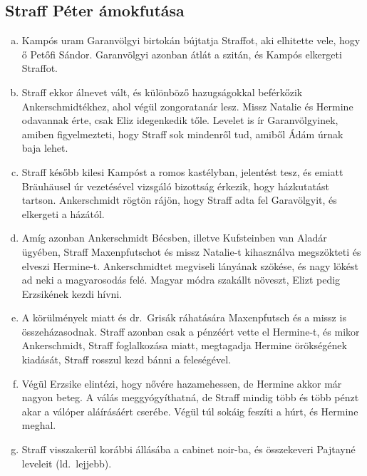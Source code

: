 \documentclass{thesis-ekf}
\theoremstyle{definition}
\begin{document}
    \subsection{Straff Péter ámokfutása}

    \begin{enumerate}[a)]
        \item\label{itm:Petofi} Kampós uram Garanvölgyi birtokán bújtatja Straffot, aki elhitette vele, hogy ő Petőfi Sándor.
        Garanvölgyi azonban átlát a szitán, és Kampós elkergeti Straffot.
        \item\label{itm:Bogumil} Straff ekkor álnevet vált, és különböző hazugságokkal beférkőzik Ankerschmidtékhez, ahol végül zongoratanár lesz.
        Missz Natalie és Hermine odavannak érte, csak Eliz idegenkedik tőle.
        Levelet is ír Garanvölgyinek, amiben figyelmezteti, hogy Straff sok mindenről tud, amiből Ádám úrnak baja lehet.
        \item\label{itm:hazkutatas} Straff később kilesi Kampóst a romos kastélyban, jelentést tesz, és emiatt Bräuhäusel úr vezetésével
            vizsgáló bizottság érkezik, hogy házkutatást tartson.
        Ankerschmidt rögtön rájön, hogy Straff adta fel Garavölgyit, és elkergeti a házától.
        \item\label{itm:Hermine-szokese} Amíg azonban Ankerschmidt Bécsben, illetve Kufsteinben van Aladár ügyében,
            Straff Maxenpfutschot és missz Natalie-t kihasználva megszökteti és elveszi Hermine-t.
        Ankerschmidtet megviseli lányának szökése, és nagy lökést ad neki a magyarosodás felé.
        Magyar módra szakállt növeszt, Elizt pedig Erzsikének kezdi hívni.
        \item\label{itm:nincs-hozomany} A körülmények miatt és dr.~Grisák ráhatására Maxenpfutsch és a missz is összeházasodnak.
        Straff azonban csak a pénzéért vette el Hermine-t, és mikor Ankerschmidt, Straff foglalkozása miatt,
            megtagadja Hermine örökségének kiadását, Straff rosszul kezd bánni a feleségével.
        \item\label{itm:Archimedeszi-csavar} Végül Erzsike elintézi, hogy nővére hazamehessen, de Hermine akkor már nagyon beteg.
        A válás meggyógyíthatná, de Straff mindig több és több pénzt akar a válóper aláírásáért cserébe.
        Végül túl sokáig feszíti a húrt, és Hermine meghal.
        \item\label{itm:cabinet-noir} Straff visszakerül korábbi állásába a cabinet noir-ba, és összekeveri Pajtayné leveleit (ld.~lejjebb).
    \end{enumerate}
\end{document}
